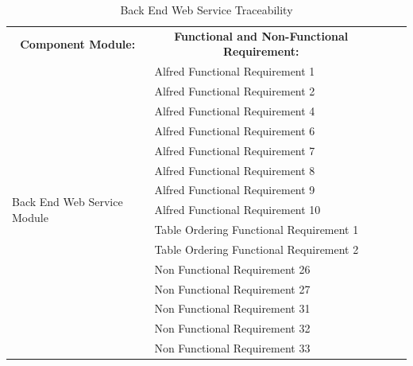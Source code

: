 \documentclass [10pt]{article}
\begin{document}
\begin{table}[h!]
\centering
\begin{tabular}{lllll}
\cline{1-2}
\multicolumn{1}{|c|}{\textbf{Component Module:}} & \multicolumn{1}{c|}{\textbf{Functional and Non-Functional Requirement:}} &  &  &  \\ \cline{1-2}
\multicolumn{1}{|l|}{\multirow{15}{*}{Back End Web Service Module}} & \multicolumn{1}{l|}{Alfred Functional Requirement 1} &  &  &  \\ \cline{2-2}
\multicolumn{1}{|l|}{} & \multicolumn{1}{l|}{Alfred Functional Requirement 2} &  &  &  \\ \cline{2-2}
\multicolumn{1}{|l|}{} & \multicolumn{1}{l|}{Alfred Functional Requirement 4} &  &  &  \\ \cline{2-2}
\multicolumn{1}{|l|}{} & \multicolumn{1}{l|}{Alfred Functional Requirement 6} &  &  &  \\ \cline{2-2}
\multicolumn{1}{|l|}{} & \multicolumn{1}{l|}{Alfred Functional Requirement 7} &  &  &  \\ \cline{2-2}
\multicolumn{1}{|l|}{} & \multicolumn{1}{l|}{Alfred Functional Requirement 8} &  &  &  \\ \cline{2-2}
\multicolumn{1}{|l|}{} & \multicolumn{1}{l|}{Alfred Functional Requirement 9} &  &  &  \\ \cline{2-2}
\multicolumn{1}{|l|}{} & \multicolumn{1}{l|}{Alfred Functional Requirement 10} &  &  &  \\ \cline{2-2}
\multicolumn{1}{|l|}{} & \multicolumn{1}{l|}{Table Ordering Functional Requirement 1} &  &  &  \\ \cline{2-2}
\multicolumn{1}{|l|}{} & \multicolumn{1}{l|}{Table Ordering Functional Requirement 2} &  &  &  \\ \cline{2-2}
\multicolumn{1}{|l|}{} & \multicolumn{1}{l|}{Non Functional Requirement 26} &  &  &  \\ \cline{2-2}
\multicolumn{1}{|l|}{} & \multicolumn{1}{l|}{Non Functional Requirement 27} &  &  &  \\ \cline{2-2}
\multicolumn{1}{|l|}{} & \multicolumn{1}{l|}{Non Functional Requirement 31} &  &  &  \\ \cline{2-2}
\multicolumn{1}{|l|}{} & \multicolumn{1}{l|}{Non Functional Requirement 32} &  &  &  \\ \cline{2-2}
\multicolumn{1}{|l|}{} & \multicolumn{1}{l|}{Non Functional Requirement 33} &  &  &  \\ \cline{1-2}
\end{tabular}
\caption{Back End Web Service Traceability}
\end{table}
\end{document}

